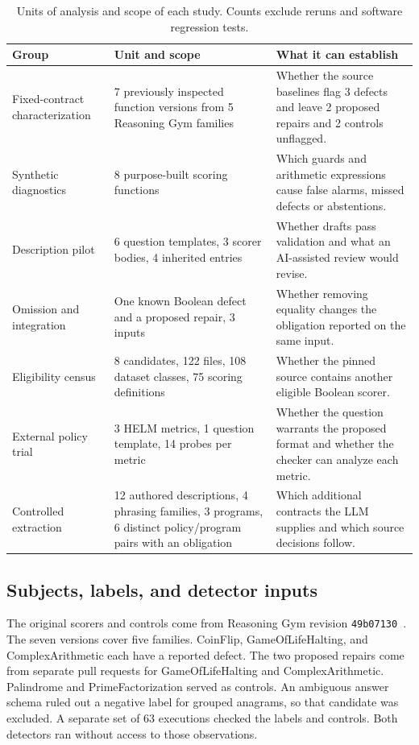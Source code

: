 \documentclass[sigconf]{acmart}
\begin{document}
\begin{table}[t]
\caption{Units of analysis and scope of each study. Counts exclude reruns and software regression tests.}
\label{tab:stages}
\centering\small
\begin{tabular}{@{}p{}p{}p{}@{}}
\toprule
Group & Unit and scope & What it can establish\\
\midrule
Fixed-contract characterization & 7 previously inspected function versions from 5 Reasoning Gym families & Whether the source baselines flag 3 defects and leave 2 proposed repairs and 2 controls unflagged.\\
Synthetic diagnostics & 8 purpose-built scoring functions & Which guards and arithmetic expressions cause false alarms, missed defects or abstentions.\\
Description pilot & 6 question templates, 3 scorer bodies, 4 inherited entries & Whether drafts pass validation and what an AI-assisted review would revise.\\
Omission and integration & One known Boolean defect and a proposed repair, 3 inputs & Whether removing equality changes the obligation reported on the same input.\\
Eligibility census & 8 candidates, 122 files, 108 dataset classes, 75 scoring definitions & Whether the pinned source contains another eligible Boolean scorer.\\
External policy trial & 3 HELM metrics, 1 question template, 14 probes per metric & Whether the question warrants the proposed format and whether the checker can analyze each metric.\\
Controlled extraction & 12 authored descriptions, 4 phrasing families, 3 programs, 6 distinct policy/program pairs with an obligation & Which additional contracts the LLM supplies and which source decisions follow.\\
\bottomrule
\end{tabular}
\end{table}

\subsection{Subjects, labels, and detector inputs}

The original scorers and controls come from Reasoning Gym revision \texttt{49b07130}~\cite{rgsource}. The seven versions cover five families. CoinFlip, GameOfLifeHalting, and ComplexArithmetic each have a reported defect. The two proposed repairs come from separate pull requests for GameOfLifeHalting and ComplexArithmetic. Palindrome and PrimeFactorization served as controls. An ambiguous answer schema ruled out a negative label for grouped anagrams, so that candidate was excluded. A separate set of 63 executions checked the labels and controls. Both detectors ran without access to those observations.
\end{document}
